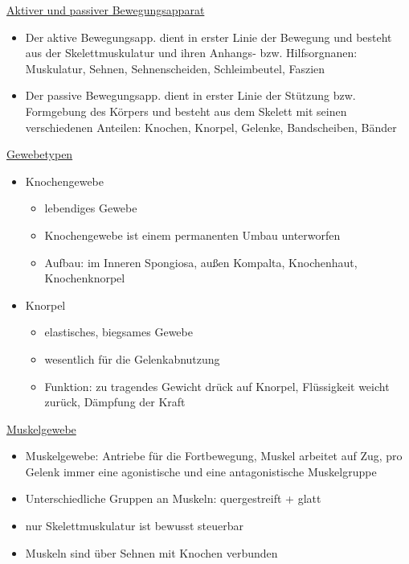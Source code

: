 \documentclass[a4paper,10pt,oneside]{article}
\begin{document}
\underline{Aktiver und passiver Bewegungsapparat} \\
 	\begin{itemize}
 		\item Der aktive Bewegungsapp. dient in erster Linie der Bewegung und besteht aus der Skelettmuskulatur und ihren Anhangs- bzw. Hilfsorgnanen: Muskulatur, Sehnen, Sehnenscheiden, Schleimbeutel, Faszien
 		\item Der passive Bewegungsapp. dient in erster Linie der Stützung bzw. Formgebung des Körpers und besteht aus dem Skelett mit seinen verschiedenen Anteilen: Knochen, Knorpel, Gelenke, Bandscheiben, Bänder
 	\end{itemize}
 
 
\underline{Gewebetypen} \\
 	\begin{itemize}
 		\item Knochengewebe
 			\begin{itemize}
 				\item lebendiges Gewebe
 				\item Knochengewebe ist einem permanenten Umbau unterworfen
 				\item Aufbau: im Inneren Spongiosa, außen Kompalta, Knochenhaut, Knochenknorpel
 			\end{itemize}
 		\item Knorpel
 			\begin{itemize}
 				\item elastisches, biegsames Gewebe
 				\item wesentlich für die Gelenkabnutzung
 				\item Funktion: zu tragendes Gewicht drück auf Knorpel, Flüssigkeit weicht zurück, Dämpfung der Kraft
 			\end{itemize}
 	\end{itemize}
 	
 
\underline{Muskelgewebe} \\
	\begin{itemize}
		\item Muskelgewebe: Antriebe für die Fortbewegung, Muskel arbeitet auf Zug, pro Gelenk immer eine agonistische und eine antagonistische Muskelgruppe
		\item Unterschiedliche Gruppen an Muskeln: quergestreift + glatt
		\item nur Skelettmuskulatur ist bewusst steuerbar
		\item Muskeln sind über Sehnen mit Knochen verbunden
	\end{itemize}
	
\end{document}
